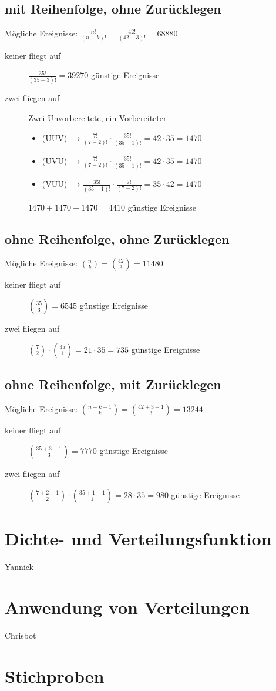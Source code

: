 \documentclass[11pt, a4paper]{article}
\begin{document}
\subsection{mit Reihenfolge, ohne Zurücklegen}
Mögliche Ereignisse: $\frac{n!}{(n-k)!} = \frac{42!}{(42-3)!} = 68880$
\begin{description}
	\item[keiner fliegt auf] $\frac{35!}{(35-3)!} = 39270$ günstige Ereignisse
	\item[zwei fliegen auf] Zwei Unvorbereitete, ein Vorbereiteter
		\begin{itemize}
			\item (UUV) $\rightarrow \frac{7!}{(7-2)!} \cdot \frac{35!}{(35-1)!} = 42 \cdot 35 = 1470$
			\item (UVU) $\rightarrow \frac{7!}{(7-2)!} \cdot \frac{35!}{(35-1)!} = 42 \cdot 35 = 1470$
			\item (VUU) $\rightarrow \frac{35!}{(35-1)!} \cdot \frac{7!}{(7-2)!} = 35 \cdot 42 = 1470$
		\end{itemize}
		$1470 + 1470 + 1470 = 4410$ günstige Ereignisse
\end{description}

\subsection{ohne Reihenfolge, ohne Zurücklegen}
Mögliche Ereignisse: $\binom{n}{k} = \binom{42}{3} = 11480$
\begin{description}
	\item[keiner fliegt auf] $\binom{35}{3} = 6545$  günstige Ereignisse
	\item[zwei fliegen auf] $\binom{7}{2} \cdot \binom{35}{1} = 21 \cdot 35 = 735$  günstige Ereignisse
\end{description}

\subsection{ohne Reihenfolge, mit Zurücklegen}
Mögliche Ereignisse: $\binom{n+k-1}{k} = \binom{42+3-1}{3} = 13244$
\begin{description}
	\item[keiner fliegt auf] $\binom{35+3-1}{3} = 7770$ günstige Ereignisse
	\item[zwei fliegen auf] $\binom{7+2-1}{2} \cdot \binom{35+1-1}{1} = 28 \cdot 35 = 980$ günstige Ereignisse
\end{description}

\newpage
\section{Dichte- und Verteilungsfunktion}
Yannick

\newpage
\section{Anwendung von Verteilungen}
Chrisbot

\newpage
\section{Stichproben}
\end{document}
